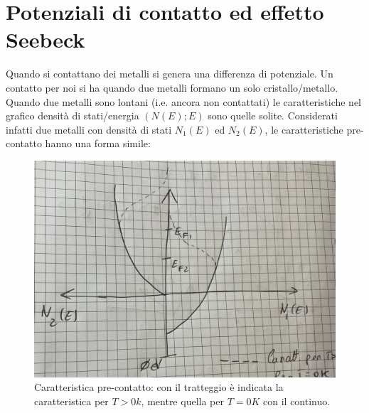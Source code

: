 \documentclass{book}
\begin{document}
    \section{Potenziali di contatto ed effetto Seebeck}
        Quando si contattano dei metalli si genera una differenza di potenziale. Un contatto per noi si ha quando due metalli formano un solo cristallo/metallo.
        Quando due metalli sono lontani (i.e. ancora non contattati) le caratteristiche nel grafico densità di stati/energia $(N(E);E)$ sono quelle solite.
        Considerati infatti due metalli con densità di stati $N_{1}(E)$ ed $N_{2}(E)$, le caratteristiche pre-contatto hanno una forma simile:
        \begin{figure}[h!]
            \centering
            \includegraphics[width=0.5\linewidth]{img/CaratteristicaSeebeckPreContatto.png}
            \caption{Caratteristica pre-contatto: con il tratteggio è indicata la caratteristica per $T>0k$, mentre quella per $T=0K$ con il continuo.}
        \end{figure}
\end{document}
